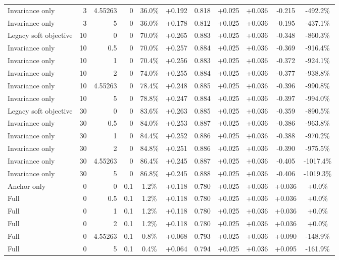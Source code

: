 \begin{table}[htbp]
\begin{tabular}{lrrrccccccc}
Invariance only & 3 & 4.55263 & 0 & 36.0\% & +0.192 & 0.818 & +0.025 & +0.036 & -0.215 & -492.2\% \\
Invariance only & 3 & 5 & 0 & 36.0\% & +0.178 & 0.812 & +0.025 & +0.036 & -0.195 & -437.1\% \\
Legacy soft objective & 10 & 0 & 0 & 70.0\% & +0.265 & 0.883 & +0.025 & +0.036 & -0.348 & -860.3\% \\
Invariance only & 10 & 0.5 & 0 & 70.0\% & +0.257 & 0.884 & +0.025 & +0.036 & -0.369 & -916.4\% \\
Invariance only & 10 & 1 & 0 & 70.4\% & +0.256 & 0.883 & +0.025 & +0.036 & -0.372 & -924.1\% \\
Invariance only & 10 & 2 & 0 & 74.0\% & +0.255 & 0.884 & +0.025 & +0.036 & -0.377 & -938.8\% \\
Invariance only & 10 & 4.55263 & 0 & 78.4\% & +0.248 & 0.885 & +0.025 & +0.036 & -0.396 & -990.8\% \\
Invariance only & 10 & 5 & 0 & 78.8\% & +0.247 & 0.884 & +0.025 & +0.036 & -0.397 & -994.0\% \\
Legacy soft objective & 30 & 0 & 0 & 83.6\% & +0.263 & 0.885 & +0.025 & +0.036 & -0.359 & -890.5\% \\
Invariance only & 30 & 0.5 & 0 & 84.0\% & +0.253 & 0.887 & +0.025 & +0.036 & -0.386 & -963.8\% \\
Invariance only & 30 & 1 & 0 & 84.4\% & +0.252 & 0.886 & +0.025 & +0.036 & -0.388 & -970.2\% \\
Invariance only & 30 & 2 & 0 & 84.8\% & +0.251 & 0.886 & +0.025 & +0.036 & -0.390 & -975.5\% \\
Invariance only & 30 & 4.55263 & 0 & 86.4\% & +0.245 & 0.887 & +0.025 & +0.036 & -0.405 & -1017.4\% \\
Invariance only & 30 & 5 & 0 & 86.8\% & +0.245 & 0.888 & +0.025 & +0.036 & -0.406 & -1019.3\% \\
Anchor only & 0 & 0 & 0.1 & 1.2\% & +0.118 & 0.780 & +0.025 & +0.036 & +0.036 & +0.0\% \\
Full & 0 & 0.5 & 0.1 & 1.2\% & +0.118 & 0.780 & +0.025 & +0.036 & +0.036 & +0.0\% \\
Full & 0 & 1 & 0.1 & 1.2\% & +0.118 & 0.780 & +0.025 & +0.036 & +0.036 & +0.0\% \\
Full & 0 & 2 & 0.1 & 1.2\% & +0.118 & 0.780 & +0.025 & +0.036 & +0.036 & +0.0\% \\
Full & 0 & 4.55263 & 0.1 & 0.8\% & +0.068 & 0.793 & +0.025 & +0.036 & +0.090 & -148.9\% \\
Full & 0 & 5 & 0.1 & 0.4\% & +0.064 & 0.794 & +0.025 & +0.036 & +0.095 & -161.9\% \\

\end{tabular}
\end{table}
